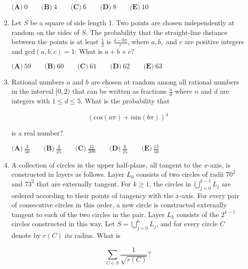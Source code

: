 \documentclass{article}
\begin{document}
\begin{enumerate}[label=\arabic*., itemsep=0.5em]
$ \textbf{(A)}\ 0 \qquad\textbf{(B)}\ 4 \qquad\textbf{(C)}\ 6 \qquad\textbf{(D)}\ 8 \qquad\textbf{(E)}\ 10$\par \vspace{0.5em}\item Let $S$ be a square of side length 1. Two points are chosen independently at random on the sides of $S$. The probability that the straight-line distance between the points is at least $\frac12$ is $\frac{a-b\pi}{c}$, where $a,b,$ and $c$ are positive integers and $\text{gcd}(a,b,c) = 1$. What is $a+b+c$?

$ \textbf{(A)}\ 59 \qquad\textbf{(B)}\ 60 \qquad\textbf{(C)}\ 61 \qquad\textbf{(D)}\ 62 \qquad\textbf{(E)}\ 63$\par \vspace{0.5em}\item Rational numbers $a$ and $b$ are chosen at random among all rational numbers in the interval $[0,2)$ that can be written as fractions $\frac{n}{d}$ where $n$ and $d$ are integers with $1 \le d \le 5$. What is the probability that

\begin{equation*}
(\text{cos}(a\pi)+i\text{sin}(b\pi))^4
\end{equation*}

is a real number?

$ \textbf{(A)}\ \frac{3}{50} \qquad\textbf{(B)}\ \frac{4}{25} \qquad\textbf{(C)}\ \frac{41}{200} \qquad\textbf{(D)}\ \frac{6}{25} \qquad\textbf{(E)}\ \frac{13}{50}$\par \vspace{0.5em}\item A collection of circles in the upper half-plane, all tangent to the $x$-axis, is constructed in layers as follows. Layer $L_0$ consists of two circles of radii $70^2$ and $73^2$ that are externally tangent. For $k\ge1$, the circles in $\bigcup_{j=0}^{k-1}L_j$ are ordered according to their points of tangency with the $x$-axis. For every pair of consecutive circles in this order, a new circle is constructed externally tangent to each of the two circles in the pair. Layer $L_k$ consists of the $2^{k-1}$ circles constructed in this way. Let $S=\bigcup_{j=0}^{6}L_j$, and for every circle $C$ denote by $r(C)$ its radius. What is

\begin{equation*}
\sum_{C\in S} \frac{1}{\sqrt{r(C)}}?
\end{equation*}




\end{enumerate}
\end{document}
